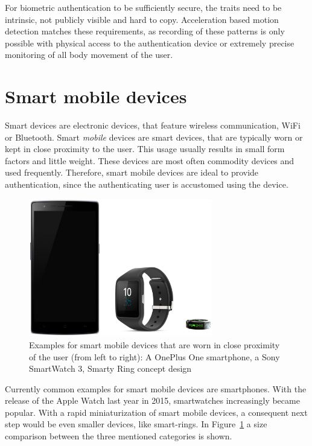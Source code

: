 For biometric authentication to be sufficiently secure, the traits need to be intrinsic, \ie not publicly visible and hard to copy. Acceleration based motion detection matches these requirements, as recording of these patterns is only possible with physical access to the authentication device or extremely precise monitoring of all body movement of the user.

\section{Smart mobile devices}
Smart devices are electronic devices, that feature wireless communication, \eg WiFi or Bluetooth. Smart \emph{mobile} devices are smart devices, that are typically worn or kept in close proximity to the user. This usage usually results in small form factors and little weight. These devices are most often commodity devices and used frequently. Therefore, smart mobile devices are ideal to provide authentication, since the authenticating user is accustomed using the device.

\begin{figure}
    \centering
    \includegraphics[width=0.7141\textwidth]{figures/SmartDevices.png}
    \caption{Examples for smart mobile devices that are worn in close proximity of the user (from left to right): A OnePlus One smartphone, a Sony SmartWatch 3, Smarty Ring concept design}
    \label{fig:smartdevices}
\end{figure}
Currently common examples for smart mobile devices are smartphones. With the release of the Apple Watch last year in 2015, smartwatches increasingly became popular. With a rapid miniaturization of smart mobile devices, a consequent next step would be even smaller devices, like smart-rings. In Figure~\ref{fig:smartdevices} a size comparison between the three mentioned categories is shown.

